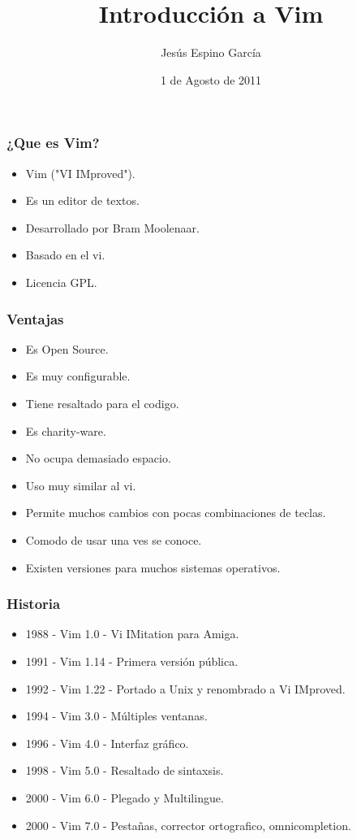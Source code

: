 \documentclass[10pt]{beamer}
\title{Introducción a Vim}
\author{Jesús Espino García}
\date{1 de Agosto de 2011}
\institute[Kaleidos]{Kaleidos}
\begin{document}
  \frame{\maketitle}


  \begin{frame}
    \frametitle{¿Que es Vim?}
    \begin{itemize}
      \item Vim ("VI IMproved").
      \item Es un editor de textos.
      \item Desarrollado por Bram Moolenaar.
      \item Basado en el vi.
      \item Licencia GPL.
    \end{itemize}
  \end{frame}

  \begin{frame}
    \frametitle{Ventajas}
  
    \begin{itemize}
      \item Es Open Source.
      \item Es muy configurable.
      \item Tiene resaltado para el codigo.
      \item Es charity-ware.
      \item No ocupa demasiado espacio.
      \item Uso muy similar al vi.
      \item Permite muchos cambios con pocas combinaciones de teclas.
      \item Comodo de usar una ves se conoce.
      \item Existen versiones para muchos sistemas operativos.
    \end{itemize}
  \end{frame}

  \begin{frame}
    \frametitle{Historia}
    \begin{itemize}
      \item 1988 - Vim 1.0 - Vi IMitation para Amiga.
      \item 1991 - Vim 1.14 - Primera versión pública.
      \item 1992 - Vim 1.22 - Portado a Unix y renombrado a Vi IMproved.
      \item 1994 - Vim 3.0 - Múltiples ventanas.
      \item 1996 - Vim 4.0 - Interfaz gráfico.
      \item 1998 - Vim 5.0 - Resaltado de sintaxsis.
      \item 2000 - Vim 6.0 - Plegado y Multilingue.
      \item 2000 - Vim 7.0 - Pestañas, corrector ortografico, omnicompletion.
    \end{itemize}
  \end{frame}
\end{document}
